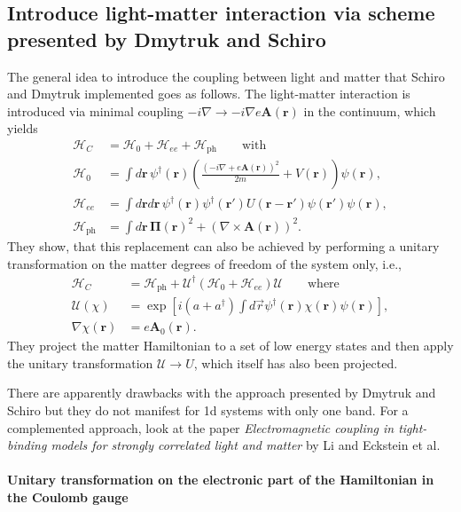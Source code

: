 \documentclass[../../main.tex]{subfiles}
\begin{document}
\subsection*{Introduce light-matter interaction via scheme presented by Dmytruk and Schiro}
The general idea to introduce the coupling between light and matter that Schiro and Dmytruk implemented goes as follows. The light-matter interaction is introduced via minimal coupling $-i\nabla \rightarrow -i\nabla e \bm A(\bm r)$ in the continuum, which yields
\begin{align}
    \mathcal H_C &= \mathcal H_0 + \mathcal H_{ee} + \mathcal H_{\text{ph}} \qquad \text{with} \\
    \mathcal H_0 &= \int d \bm r \, \psi^\dagger(\bm r) \left( \frac{(-i\nabla + e\bm A(\bm r))^2}{2m} + V(\bm r) \right) \psi(\bm r) , \\
    \mathcal H_{ee} &= \int d \bm r d \bm r \, \psi^\dagger(\bm r) \psi^\dagger(\bm r') U(\bm r - \bm r') \psi(\bm r') \psi(\bm r) , \\
    \mathcal H_{\text{ph}} &= \int d \bm r \, \bm \Pi(\bm r)^2 + (\nabla \times \bm A(\bm r))^2 .
\end{align}
They show, that this replacement can also be achieved by performing a unitary transformation on the matter degrees of freedom of the system only, i.e., 
\begin{align}
    \mathcal H_C &= \mathcal H_{\text{ph}} + \mathcal U^\dagger (\mathcal H_0 + \mathcal H_{ee}) \mathcal U \qquad \text{where} \\
    \mathcal U(\chi) &= \exp\left[ i(a+a^\dagger) \int d\vec r \psi^\dagger(\bm r) \chi(\bm r)\psi(\bm r) \right], \\
    \nabla \chi(\bm r) &= e \bm A_0(\bm r) .
\end{align} 
They project the matter Hamiltonian to a set of low energy states and then apply the unitary transformation $\mathcal U \rightarrow U$, which itself has also been projected. 

There are apparently drawbacks with the approach presented by Dmytruk and Schiro but they do not manifest for 1d systems with only one band. For a complemented approach, look at the paper \emph{Electromagnetic coupling in tight-binding models for strongly correlated light and matter} by Li and Eckstein et al.

\paragraph{Unitary transformation on the electronic part of the Hamiltonian in the Coulomb gauge}
\end{document}
